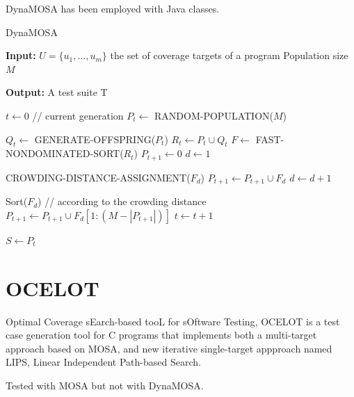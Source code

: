 DynaMOSA has been employed with Java classes.
\begin{algorithm}
    \caption{DynaMOSA}
    \hspace*{\algorithmicindent} \textbf{Input:} 
    $ U = \{u_1,...,u_m\} $ the set of coverage targets of a program
    Population size $ M $

    \hspace*{\algorithmicindent} \textbf{Output:}
    A test suite T
    
    \begin{algorithmic}[1]
        \Begin
            \State $ t \leftarrow 0 $ // current generation
            \State $ P_t \leftarrow $ RANDOM-POPULATION($ M $) 

                \State $ Q_t \leftarrow $  GENERATE-OFFSPRING($ P_t $)
                \State $ R_t \leftarrow P_t \cup Q_t $
                \State $ F \leftarrow $  FAST-NONDOMINATED-SORT($ R_t $)
                \State $ P_{t + 1} \leftarrow 0 $
                \State $ d \leftarrow 1 $

                    CROWDING-DISTANCE-ASSIGNMENT($ F_d $)
                    \State $ P_{t + 1} \leftarrow P_{t + 1} \cup F_d $
                    \State $ d \leftarrow d + 1 $
                \EndWhile

                Sort($ F_d $) // according to the crowding distance
                \State $ P_{t + 1} \leftarrow P_{t + 1} \cup F_d[1: (M - |P_{t + 1}|)] $
                \State $ t \leftarrow t + 1 $
            \EndWhile

            \State $ S \leftarrow P_t $
        \End
    \end{algorithmic}
\end{algorithm}





\section{OCELOT}
Optimal Coverage sEarch-based tooL for sOftware Testing, OCELOT \cite{DBLP:conf/ssbse/ScalabrinoGNOL16} is a test case generation tool for C programs that implements both a multi-target approach based on MOSA, and new iterative single-target appproach named LIPS, Linear Independent Path-based Search.

Tested with MOSA but not with DynaMOSA.